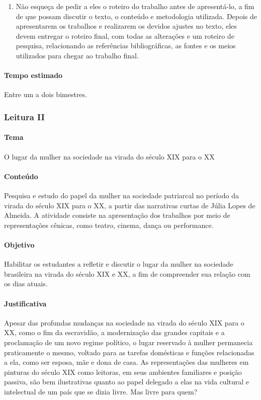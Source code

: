 \documentclass[12pt]{extarticle}
\begin{document}
\begin{enumerate}
\item
Não esqueça de pedir a eles o roteiro do trabalho antes de
apresentá-lo, a fim de que possam discutir o texto, o conteúdo e
metodologia utilizada. Depois de apresentarem os trabalhos e realizarem
os devidos ajustes no texto, eles devem entregar o roteiro final, com
todas as alterações e um roteiro de pesquisa, relacionando as
referências bibliográficas, as fontes e os meios utilizados para chegar
ao trabalho final.
\end{enumerate}

\paragraph{Tempo estimado} Entre um a dois bimestres.



\subsubsection{Leitura II}




\paragraph{Tema} O lugar da mulher na sociedade na virada do século \textsc{XIX} para o \textsc{XX}

\paragraph{Conteúdo} Pesquisa e estudo do papel da mulher na sociedade
patriarcal no período da virada do século \textsc{XIX} para o \textsc{XX}, a partir das
narrativas curtas de Júlia Lopes de Almeida. A atividade consiste na
apresentação dos trabalhos por meio de representações cênicas, como
teatro, cinema, dança ou performance.

\paragraph{Objetivo} Habilitar os estudantes a refletir e discutir o lugar
da mulher na sociedade brasileira na virada do século \textsc{XIX} e \textsc{XX}, a fim de
compreender sua relação com os dias atuais.

\paragraph{Justificativa} Apesar das profundas mudanças na sociedade na
virada do século \textsc{XIX} para o \textsc{XX}, como o fim da escravidão, a modernização
das grandes capitais e a proclamação de um novo regime político, o lugar
reservado à mulher permanecia praticamente o mesmo, voltado para as
tarefas domésticas e funções relacionadas a ela, como ser esposa, mãe e
dona de casa. As representações das mulheres em pinturas do século \textsc{XIX}
como leitoras, em seus ambientes familiares e posição passiva, são bem
ilustrativas quanto ao papel delegado a elas na vida cultural e
intelectual de um país que se dizia livre. Mas livre para quem?
\end{document}
